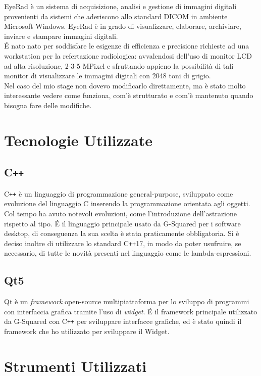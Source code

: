 EyeRad è un sistema di acquisizione, analisi e gestione di immagini digitali provenienti da sistemi che aderiscono allo standard DICOM in ambiente Microsoft Windows.
EyeRad è in grado di visualizzare, elaborare, archiviare, inviare e stampare immagini digitali.
\\
\'E nato nato per soddisfare le esigenze di efficienza e precisione richieste ad una workstation per la refertazione radiologica: avvalendosi dell’uso di monitor LCD ad alta risoluzione, 2-3-5 MPixel e sfruttando appieno la possibilità di tali monitor di visualizzare le immagini digitali con 2048 toni di grigio.
\\
Nel caso del mio stage non dovevo modificarlo direttamente, ma è stato molto interessante vedere come funziona, com'è strutturato e com'è mantenuto quando bisogna fare delle modifiche.

\section{Tecnologie Utilizzate}
\subsection{C\texttt{++}}\label{sec:C++}
C\texttt{++} è un linguaggio di programmazione general-purpose, sviluppato come evoluzione del linguaggio C inserendo la programmazione orientata agli oggetti. Col tempo ha avuto notevoli evoluzioni, come l'introduzione dell'astrazione rispetto al tipo. \'E il linguaggio principale usato da G-Squared per i software desktop, di conseguenza la sua scelta è stata praticamente obbligatoria. Si è deciso inoltre di utilizzare lo standard C\texttt{++}17, in modo da poter usufruire, se necessario, di tutte le novità presenti nel linguaggio come le lambda-espressioni.

\subsection{Qt5}\label{sec:Qt5}
Qt è un \textit{framework} open-source multipiattaforma per lo sviluppo di programmi con interfaccia grafica tramite l'uso di \textit{widget}.
\'E il framework principale utilizzato da G-Squared con C\texttt{++} per sviluppare interfacce grafiche, ed è stato quindi il framework che ho utilizzato per sviluppare il Widget.

\newpage
\section{Strumenti Utilizzati}
